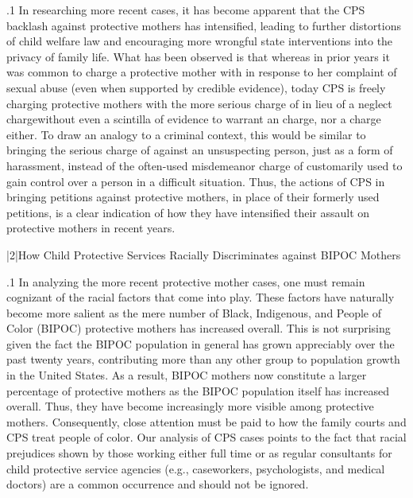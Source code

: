 \documentclass[11pt, twoside]{article}
\begin{document}
{\p.1{%
In researching more recent cases, it has become apparent that the CPS
backlash against protective mothers has intensified, leading to further
distortions of child welfare law and encouraging more wrongful state
interventions into the privacy of family life. What has been observed
is that whereas in prior years it was common to charge a protective
mother with  in response to her complaint of sexual abuse
(even when supported by credible evidence), today CPS is freely charging protective mothers with the more serious charge of \mdash{}in lieu
of a neglect charge\mdash{}without even a scintilla of evidence to warrant an
 charge, nor a  charge either. To draw an analogy to a
criminal context, this would be similar to bringing the serious charge of
 against an unsuspecting person, just as a form of harassment, instead of the often-used misdemeanor charge of \mdash{}customarily used to gain control over a person in a difficult
situation. Thus, the actions of CPS in bringing  petitions against
protective mothers, in place of their formerly used  petitions, is
a clear indication of how they have intensified their assault on protective
mothers in recent years.
}%


\s|2|{How Child Protective Services Racially Discriminates against BIPOC Mothers}

\p.1{%
\noindent{}In analyzing the more recent protective mother cases, one must remain
cognizant of the racial factors that come into play. These factors have
naturally become more salient as the mere number of Black, Indigenous,
and People of Color (BIPOC) protective mothers has increased overall.
This is not surprising given the fact the BIPOC population in general
has grown appreciably over the past twenty years, contributing more
than any other group to population growth in the United States. As
a result, BIPOC mothers now constitute a larger percentage of protective mothers as the BIPOC population itself has increased overall. Thus,
they have become increasingly more visible among protective mothers.
Consequently, close attention must be paid to how the family courts
and CPS treat people of color. Our analysis of CPS cases points to the
fact that racial prejudices shown by those working either full time or as
regular consultants for child protective service agencies (e.g., caseworkers, psychologists, and medical doctors) are a common occurrence and
should not be ignored.
}%

}
\end{document}
